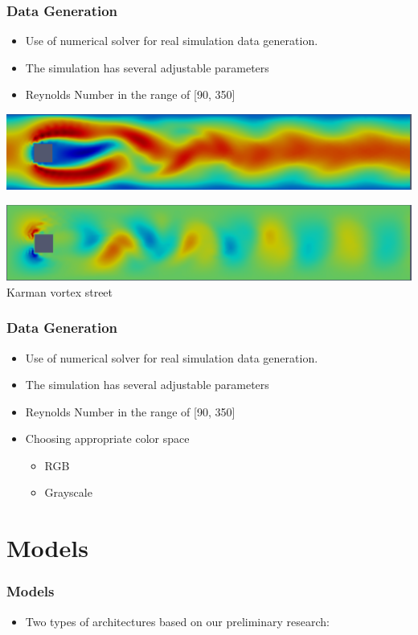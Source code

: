 \documentclass[18pt]{beamer}
\begin{document}
\begin{frame}[t]
  \frametitle{Data Generation}
  \begin{itemize}
  \item Use of numerical solver for real simulation data generation.
  \item The simulation has several adjustable parameters
  \item Reynolds Number in the range of [90, 350]
  \end{itemize}
  \begin{center}
    \includegraphics[scale=0.21]{images/x-direction}
  \end{center}
  \begin{center}
    \includegraphics[scale=0.21]{images/y-direction} \\
    \caption{Karman vortex street}
  \end{center}
\end{frame}

\begin{frame}[t]
  \frametitle{Data Generation}
  \begin{itemize}
  \item Use of numerical solver for real simulation data generation.
  \item The simulation has several adjustable parameters
  \item Reynolds Number in the range of [90, 350]
  \item Choosing appropriate color space
    \begin{itemize}
    \item RGB
    \item Grayscale
    \end{itemize}
  \end{itemize}
\end{frame}

\section{Models}
\begin{frame}[t]
  \frametitle{Models}
  \begin{itemize}
  \item Two types of architectures based on our preliminary research:
  \end{itemize}
\end{frame}
\end{document}
